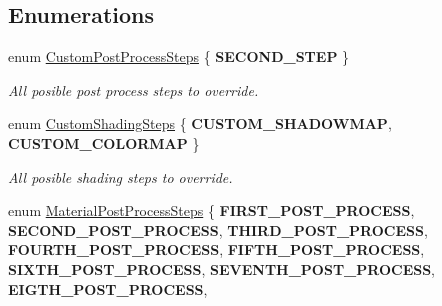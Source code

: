 \subsection*{Enumerations}
\begin{DoxyCompactItemize}
\item 
\mbox{\label{namespace_geometry_engine_1_1_custom_shading_a09e44ca81de5fe08c6d50271d680c4b1}} 
enum \mbox{\hyperlink{namespace_geometry_engine_1_1_custom_shading_a09e44ca81de5fe08c6d50271d680c4b1}{Custom\+Post\+Process\+Steps}} \{ {\bfseries S\+E\+C\+O\+N\+D\+\_\+\+S\+T\+EP}
 \}
\begin{DoxyCompactList}\small\item\em All posible post process steps to override. \end{DoxyCompactList}\item 
\mbox{\label{namespace_geometry_engine_1_1_custom_shading_a2dc236a5b567da5099069ce2b2be5609}} 
enum \mbox{\hyperlink{namespace_geometry_engine_1_1_custom_shading_a2dc236a5b567da5099069ce2b2be5609}{Custom\+Shading\+Steps}} \{ {\bfseries C\+U\+S\+T\+O\+M\+\_\+\+S\+H\+A\+D\+O\+W\+M\+AP}, 
{\bfseries C\+U\+S\+T\+O\+M\+\_\+\+C\+O\+L\+O\+R\+M\+AP}
 \}
\begin{DoxyCompactList}\small\item\em All posible shading steps to override. \end{DoxyCompactList}\item 
\mbox{\label{namespace_geometry_engine_1_1_custom_shading_af8b09b91ca7086f4f67a5d4181f35e58}} 
enum \mbox{\hyperlink{namespace_geometry_engine_1_1_custom_shading_af8b09b91ca7086f4f67a5d4181f35e58}{Material\+Post\+Process\+Steps}} \{ \newline
{\bfseries F\+I\+R\+S\+T\+\_\+\+P\+O\+S\+T\+\_\+\+P\+R\+O\+C\+E\+SS}, 
{\bfseries S\+E\+C\+O\+N\+D\+\_\+\+P\+O\+S\+T\+\_\+\+P\+R\+O\+C\+E\+SS}, 
{\bfseries T\+H\+I\+R\+D\+\_\+\+P\+O\+S\+T\+\_\+\+P\+R\+O\+C\+E\+SS}, 
{\bfseries F\+O\+U\+R\+T\+H\+\_\+\+P\+O\+S\+T\+\_\+\+P\+R\+O\+C\+E\+SS}, 
\newline
{\bfseries F\+I\+F\+T\+H\+\_\+\+P\+O\+S\+T\+\_\+\+P\+R\+O\+C\+E\+SS}, 
{\bfseries S\+I\+X\+T\+H\+\_\+\+P\+O\+S\+T\+\_\+\+P\+R\+O\+C\+E\+SS}, 
{\bfseries S\+E\+V\+E\+N\+T\+H\+\_\+\+P\+O\+S\+T\+\_\+\+P\+R\+O\+C\+E\+SS}, 
{\bfseries E\+I\+G\+T\+H\+\_\+\+P\+O\+S\+T\+\_\+\+P\+R\+O\+C\+E\+SS}, 

\end{DoxyCompactItemize}
